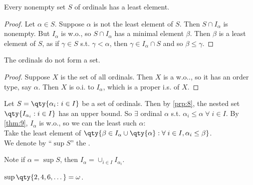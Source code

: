 \begin{proposition} \label{prp:10}
    Every nonempty set $S$ of ordinals has a least element.
\end{proposition}

\begin{proof}
    Let $\alpha \in S$.
    Suppose $\alpha$ is not the least element of $S$.
    Then $S \cap I_\alpha$ is nonempty.
    But $I_\alpha$ is w.o., so $S \cap I_\alpha$ has a minimal element $\beta$.
    Then $\beta$ is a least element of $S$, as if $\gamma \in S$ s.t. $\gamma < \alpha$, then $\gamma \in I_\alpha \cap S$ and so $\beta \leq \gamma$.
\end{proof}

\begin{theorem}
    The ordinals do not form a set.
\end{theorem}

\begin{proof}
    Suppose $X$ is the set of all ordinals.
    Then $X$ is a w.o.., so it has an order type, say $\alpha$.
    Then $X$ is o.i. to $I_\alpha$, which is a proper i.s. of $X$. \Lightning
\end{proof}

\begin{remark}
    Let $S = \qty{\alpha_i \colon i \in I}$ be a set of ordinals.
    Then by \cref{prp:8}, the nested set $\qty{I_{\alpha_i} : i \in I}$ has an upper bound.
    So $\exists$ ordinal $\alpha$ s.t. $\alpha_i \leq \alpha \; \forall \; i \in I$.
    By \cref{thm:9}, $I_\alpha$ is w.o., so we can the least such $\alpha$: \\
    Take the least element of $\qty{\beta \in I_\alpha \cup \qty{\alpha} : \forall \; i \in I, \alpha_i \leq \beta}$. \\
    We denote by ``$\sup S$'' the .

    Note if $\alpha = \sup S$, then $I_\alpha = \cup_{i \in I} I_{\alpha_i}$.
\end{remark}

\begin{example}
    $\sup \qty{2, 4, 6, \dots} = \omega$.
\end{example}

